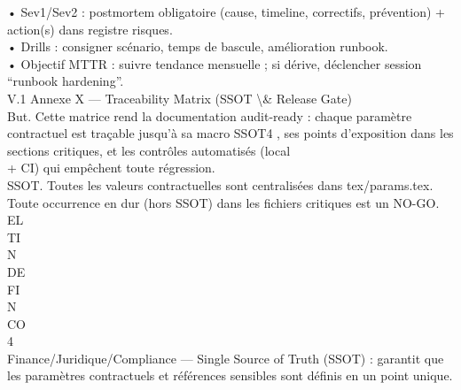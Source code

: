 \documentclass[12pt,landscape,a4paper]{article}
\begin{document}
• Sev1/Sev2 : postmortem obligatoire (cause, timeline, correctifs, prévention) + action(s) dans registre risques.\\
\vspace{0.5em}
• Drills : consigner scénario, temps de bascule, amélioration runbook.\\
\vspace{0.5em}
• Objectif MTTR : suivre tendance mensuelle ; si dérive, déclencher session “runbook hardening”.\\
\vspace{0.5em}
\vspace{0.5em}
\vspace{0.5em}
\vspace{0.5em}
V.1 Annexe X — Traceability Matrix (SSOT \textbackslash{}& Release Gate)\\
But. Cette matrice rend la documentation audit-ready : chaque paramètre contractuel est traçable jusqu’à sa macro SSOT4 , ses points d’exposition dans les sections critiques, et les contrôles automatisés (local\\
\vspace{0.5em}
+ CI) qui empêchent toute régression.\\
\vspace{0.5em}
SSOT. Toutes les valeurs contractuelles sont centralisées dans tex/params.tex. Toute occurrence en dur (hors SSOT) dans les fichiers critiques est un NO-GO.\\
\vspace{0.5em}
\vspace{0.5em}
\vspace{0.5em}
\vspace{0.5em}
EL\\
TI\\
N\\
DE\\
FI\\
N\\
CO\\
\vspace{0.5em}
\vspace{0.5em}
\vspace{0.5em}
\vspace{0.5em}
4\\
Finance/Juridique/Compliance — Single Source of Truth (SSOT) : garantit que les paramètres contractuels et références sensibles sont définis en un point unique.\\
\vspace{0.5em}
\vspace{0.5em}
\end{document}
